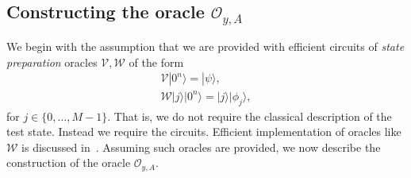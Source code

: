 \documentclass[a4paper,twocolumn,11pt,unpublished]{quantumarticle}
\newcommand{\rang}{\rangle}
\begin{document}
    \subsection{Constructing the oracle $\mathcal O_{y,A}$}
    We begin with the assumption that we are provided with efficient circuits of \textit{state preparation} oracles $\mathcal V, \mathcal W$ of the form
    \begin{gather}
        \mathcal V |0^n\rang  = |\psi\rang,\\
        \mathcal W|j\rang |0^n\rang =|j\rang|\phi_j \rang,
    \end{gather}
    for $j \in \{0, \ldots, M-1\}$. That is, we do not require the classical description of the test state. Instead we require the circuits. Efficient implementation of oracles like $ \mathcal{W}$ is discussed in~\cite{Kerenidis2016}. Assuming such oracles are provided, we now describe the construction of the oracle $\mathcal O_{y,A}$.
\end{document}
